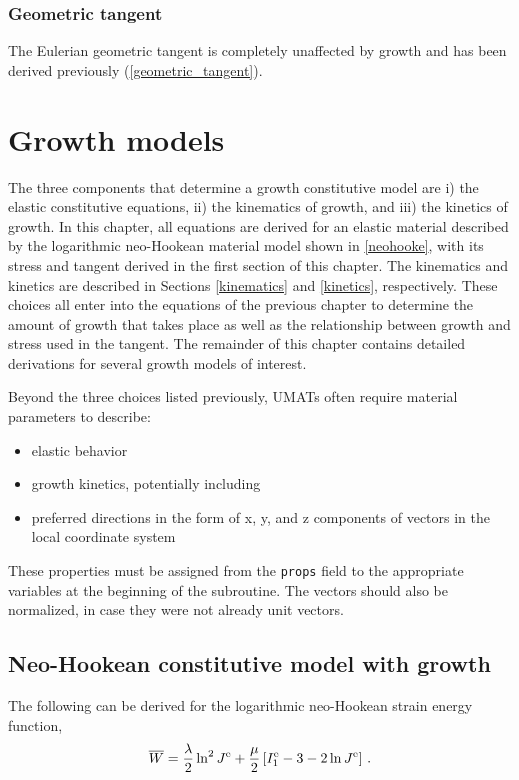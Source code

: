 \documentclass[10pt,letterpaper,oneside]{report}
\newcommand{\scas}[1]{\mbox{{\scriptsize{${\rm{#1}}$}}}{}}
\begin{document}
\subsection{Geometric tangent}
The Eulerian geometric tangent is completely unaffected by growth and has been derived previously (\autoref{geometric_tangent}).


\chapter{Growth models}
The three components that determine a growth constitutive model are i) the elastic constitutive equations, ii) the kinematics of growth, and iii) the kinetics of growth.  
In this chapter, all equations are derived for an elastic material described by the logarithmic neo-Hookean material model shown in \autoref{neohooke}, with its stress and tangent derived in the first section of this chapter.  
The kinematics and kinetics are described in Sections \ref{kinematics} and \ref{kinetics}, respectively.
These choices all enter into the equations of the previous chapter to determine the amount of growth that takes place as well as the relationship between growth and stress used in the tangent.  
The remainder of this chapter contains detailed derivations for several growth models of interest.  

Beyond the three choices listed previously, UMATs often require material parameters to describe: 
\begin{itemize}
\item elastic behavior
\item growth kinetics, potentially including
\item preferred directions in the form of x, y, and z components of vectors in the local coordinate system
\end{itemize}
These properties must be assigned from the \texttt{props} field to the appropriate variables at the beginning of the subroutine.  The vectors should also be normalized, in case they were not already unit vectors.  

\section{Neo-Hookean constitutive model with growth}
The following can be derived for the logarithmic neo-Hookean strain energy function, 
\begin{equation}
\overline{W} = \frac{\lambda}{2} \ln^2 J^{\scas{e}} + \frac{\mu}{2} \left[ I_1^{\scas{e}} - 3 - 2 \ln J^{\scas{e}} \right] \, . 
\label{neohooke}
\end{equation}
\end{document}
